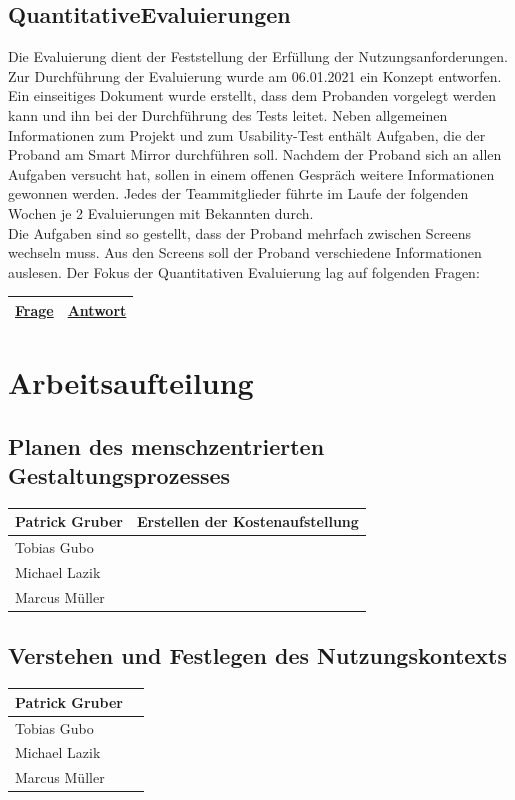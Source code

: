 \documentclass[12pt, a4paper]{scrartcl}
\begin{document}
	\subsection{QuantitativeEvaluierungen}
	Die Evaluierung dient der Feststellung der Erfüllung der Nutzungsanforderungen. Zur Durchführung der Evaluierung wurde am 06.01.2021 ein Konzept entworfen. Ein einseitiges Dokument wurde erstellt, dass dem Probanden vorgelegt werden kann und ihn bei der Durchführung des Tests leitet. Neben allgemeinen Informationen zum Projekt und zum Usability-Test enthält Aufgaben, die der Proband am Smart Mirror durchführen soll. Nachdem der Proband sich an allen Aufgaben versucht hat, sollen in einem offenen Gespräch weitere Informationen gewonnen werden. Jedes der Teammitglieder führte im Laufe der folgenden Wochen je 2 Evaluierungen mit Bekannten durch.\\
	Die Aufgaben sind so gestellt, dass der Proband mehrfach zwischen Screens wechseln muss. Aus den Screens soll der Proband verschiedene Informationen auslesen. Der Fokus der Quantitativen Evaluierung lag auf folgenden Fragen:\\
	\begin{tabularx}{0.95\textwidth}{|X|X|}
		\hline
		\textcolor{tumbleweed}{\underline{\textbf{Frage}}} & \textcolor{tumbleweed}{\underline{\textbf{Antwort}}}\\
		\hline
	\end{tabularx}
	
	
	
	
	
	\section{Arbeitsaufteilung}
	\subsection*{Planen des menschzentrierten Gestaltungsprozesses}
	\begin{tabularx}{0.95\textwidth}{|l|X|}
		\hline
		Patrick Gruber & Erstellen der Kostenaufstellung\\
		\hline
		Tobias Gubo & \\
		\hline
		Michael Lazik & \\
		\hline
		Marcus Müller & \\
		\hline
	\end{tabularx}
	
	\subsection*{Verstehen und Festlegen des Nutzungskontexts}
	\begin{tabularx}{0.95\textwidth}{|l|X|}
		\hline
		Patrick Gruber & \\
		\hline
		Tobias Gubo & \\
		\hline
		Michael Lazik & \\
		\hline
		Marcus Müller & \\
		\hline
	\end{tabularx}
\end{document}
